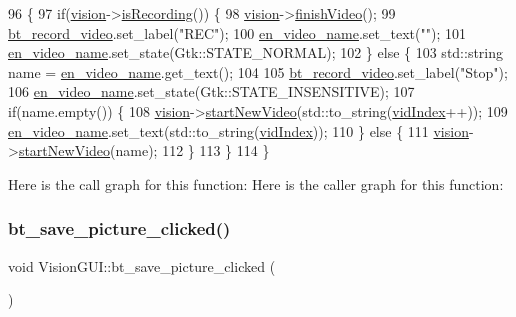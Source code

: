 \begin{DoxyCode}
96                                         \{
97     \textcolor{keywordflow}{if}(\hyperlink{class_vision_g_u_i_a36aba058af844ec6cbe0c945c616cd5f}{vision}->\hyperlink{class_vision_a7990c9cb8684e1d1c92a5b6aa99abe6f}{isRecording}()) \{
98         \hyperlink{class_vision_g_u_i_a36aba058af844ec6cbe0c945c616cd5f}{vision}->\hyperlink{class_vision_a5c7366071fde8a1b916be0721adaa275}{finishVideo}();
99         \hyperlink{class_vision_g_u_i_a19751ae6ddc4bef7fcc0edee42820714}{bt\_record\_video}.set\_label(\textcolor{stringliteral}{"REC"});
100         \hyperlink{class_vision_g_u_i_ab09e0f327e58a9d8e10ae343037a3ce2}{en\_video\_name}.set\_text(\textcolor{stringliteral}{""});
101         \hyperlink{class_vision_g_u_i_ab09e0f327e58a9d8e10ae343037a3ce2}{en\_video\_name}.set\_state(Gtk::STATE\_NORMAL);
102     \} \textcolor{keywordflow}{else} \{
103         std::string name = \hyperlink{class_vision_g_u_i_ab09e0f327e58a9d8e10ae343037a3ce2}{en\_video\_name}.get\_text();
104 
105         \hyperlink{class_vision_g_u_i_a19751ae6ddc4bef7fcc0edee42820714}{bt\_record\_video}.set\_label(\textcolor{stringliteral}{"Stop"});
106         \hyperlink{class_vision_g_u_i_ab09e0f327e58a9d8e10ae343037a3ce2}{en\_video\_name}.set\_state(Gtk::STATE\_INSENSITIVE);
107         \textcolor{keywordflow}{if}(name.empty()) \{
108           \hyperlink{class_vision_g_u_i_a36aba058af844ec6cbe0c945c616cd5f}{vision}->\hyperlink{class_vision_ae3ec43e811508f326910f99c416332db}{startNewVideo}(std::to\_string(\hyperlink{class_vision_g_u_i_a778e610a8026011498e6a685d88b3fbe}{vidIndex}++));
109           \hyperlink{class_vision_g_u_i_ab09e0f327e58a9d8e10ae343037a3ce2}{en\_video\_name}.set\_text(std::to\_string(\hyperlink{class_vision_g_u_i_a778e610a8026011498e6a685d88b3fbe}{vidIndex}));
110       \} \textcolor{keywordflow}{else} \{
111           \hyperlink{class_vision_g_u_i_a36aba058af844ec6cbe0c945c616cd5f}{vision}->\hyperlink{class_vision_ae3ec43e811508f326910f99c416332db}{startNewVideo}(name);
112       \}
113   \}
114 \}
\end{DoxyCode}
Here is the call graph for this function\+:
Here is the caller graph for this function\+:
\mbox{\label{class_vision_g_u_i_a0f0a52b29ccd843b3e5a200d2618cd6a}} 
\subsubsection{\texorpdfstring{bt\+\_\+save\+\_\+picture\+\_\+clicked()}{bt\_save\_picture\_clicked()}}
{\footnotesize\ttfamily void Vision\+G\+U\+I\+::bt\+\_\+save\+\_\+picture\+\_\+clicked (\begin{DoxyParamCaption}{ }\end{DoxyParamCaption})\hspace{0.3cm}{\ttfamily [private]}}



